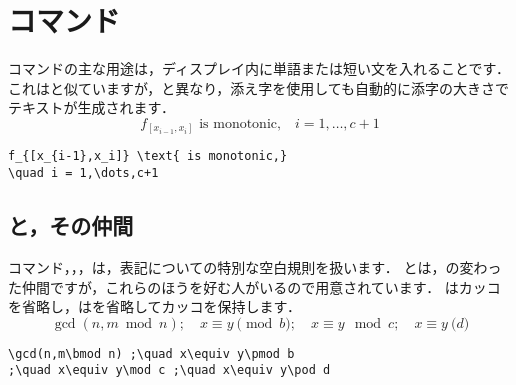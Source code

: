 
\section{コマンド}

コマンドの主な用途は，ディスプレイ内に単語または短い文を入れることです．
これはと似ていますが，と異なり，添え字を使用しても自動的に添字の大きさでテキストが生成されます．
\begin{equation}
f_{[x_{i-1},x_i]} \text{ is monotonic,}
\quad i = 1,\dots,c+1
\end{equation}
\begin{verbatim}
f_{[x_{i-1},x_i]} \text{ is monotonic,}
\quad i = 1,\dots,c+1
\end{verbatim}

\subsection{ と，その仲間}

コマンド，，，は，表記についての特別な空白規則を扱います．
とは，の変わった仲間ですが，これらのほうを好む人がいるので用意されています．
はカッコを省略し，はを省略してカッコを保持します．
\begin{equation}
\gcd(n,m\bmod n) ;\quad x\equiv y\pmod b
;\quad x\equiv y\mod c ;\quad x\equiv y\pod d
\end{equation}
\begin{verbatim}
\gcd(n,m\bmod n) ;\quad x\equiv y\pmod b
;\quad x\equiv y\mod c ;\quad x\equiv y\pod d
\end{verbatim}

